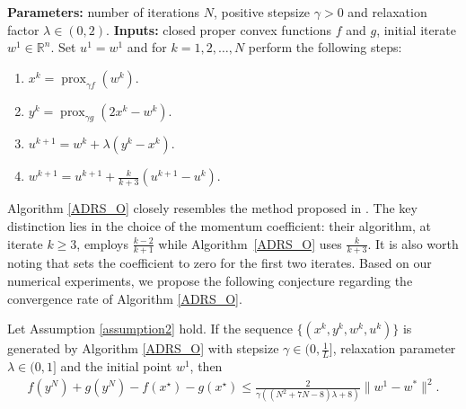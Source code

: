 \documentclass[ijoc,sglanonrev]{informs4}
\begin{document}
\begin{algorithm}
\caption{Accelerated DRS algorithm}
\begin{algorithmic}
\State \textbf{Parameters:} number of iterations $N$,  positive stepsize $\gamma>0$ and relaxation factor $\lambda\in (0, 2)$.
\State \textbf{Inputs:} closed proper convex functions $f$ and $g$, initial iterate $w^1 \in \mathbb{R}^n$.
\State Set $u^1=w^1$ and for $k=1, 2, \ldots, N$ perform the following steps:\\
\begin{enumerate}[label=\roman*)]
\item 
$x^k = \operatorname{prox}_{\gamma f}(w^k)$.
\item
$y^k = \operatorname{prox}_{\gamma g}(2x^k - w^k)$.
\item
$u^{k+1} = w^k + \lambda (y^k - x^k)$.
\item
$w^{k+1} = u^{k+1} + \tfrac{k}{k+3} (u^{k+1} - u^k)$.
\end{enumerate}
\end{algorithmic}
\label{ADRS_O}
\end{algorithm}

Algorithm \ref{ADRS_O} closely resembles the method proposed in \cite{patrinos2014douglas}. The key distinction lies in the choice of the momentum coefficient: their algorithm, at iterate $k\geq 3$, employs \(\tfrac{k-2}{k+1}\) while Algorithm~\ref{ADRS_O} uses \(\tfrac{k}{k+3}\). 
It is also worth noting that \cite{patrinos2014douglas} sets the coefficient to zero for the first two iterates.
Based on our numerical experiments, we propose the following conjecture regarding the convergence rate of Algorithm \ref{ADRS_O}.

\begin{conjecture} \label{Conjecture_4}
Let Assumption \ref{assumption2} hold. If the sequence $\{(x^k, y^k, w^k, u^k)\}$ is generated by Algorithm \ref{ADRS_O} with stepsize $\gamma\in (0, \tfrac{1}{L}]$, relaxation parameter $\lambda\in (0, 1]$ and the initial point $w^1$, then 
\begin{align*}
 f(y^N)+g(y^N) - f(x^\star)-g(x^\star) \leq \tfrac{2}{\gamma((N^2+7N-8)\lambda + 8)} \|w^1 - w^*\|^2. 
\end{align*}
\end{conjecture}
%
%
\end{document}
